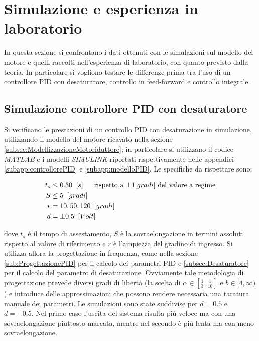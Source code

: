 \section{Simulazione e esperienza in laboratorio}
\label{sec:simLab}

	In questa sezione si confrontano i dati ottenuti con le simulazioni sul modello del motore e quelli raccolti nell'esperienza di laboratorio, con quanto previsto dalla teoria. In particolare si vogliono testare le differenze prima tra l'uso di un controllore PID con desaturatore, controllo in feed-forward e controllo integrale.
	
	\subsection{Simulazione controllore PID con desaturatore}
	\label{subsec:PIDvsPIDdesa}
	
		Si verificano le prestazioni di un controllo PID con desaturazione in simulazione, utilizzando il modello del motore ricavato nella sezione \ref{subsec:ModellizzazioneMotoriduttore}; in particolare si utilizzano il codice \textit{MATLAB} e i modelli \textit{SIMULINK} riportati rispettivamente nelle appendici \ref{subapp:controllorePID} e \ref{subapp:modelloPID}. 
		\newline Le specifiche da rispettare sono:
		
		\begin{align*}
			t_s &\le 0.30 \singleSpacing [s] \trippleSpacing \textnormal{rispetto a $\pm 1 [gradi]$ del valore a regime} \\
			S &\le 5 \singleSpacing [gradi] \\
			r &= 10,50,120 \singleSpacing [gradi] \\
			d &= \pm 0.5 \singleSpacing [Volt] \\
		\end{align*}
		
		\noindent dove $t_s$ è il tempo di assestamento, $S$ è la sovraelongazione in termini assoluti rispetto al valore di
		riferimento e $r$ è l'ampiezza del gradino di ingresso. Si utilizza allora la progettazione in frequenza, come nella sezione \ref{sub:ProgettazionePID} per il calcolo dei parametri PID e \ref{subsec:Desaturatore} per il calcolo del parametro di desaturazione. Ovviamente tale metodologia di progettazione prevede diversi gradi di libertà (la scelta di $\alpha \in [\frac{1}{3},\frac{1}{10}]
		$ e $b \in [4, \infty)$) e introduce delle approssimazioni che possono rendere necessaria una taratura manuale dei parametri. Le simulazioni sono state suddivise per $d=0.5$ e $d=-0.5$. Nel primo caso l'uscita del sistema risulta più veloce ma con una sovraelongazione piuttosto marcata, mentre nel secondo è più lenta ma con meno sovraelongazione.
		
